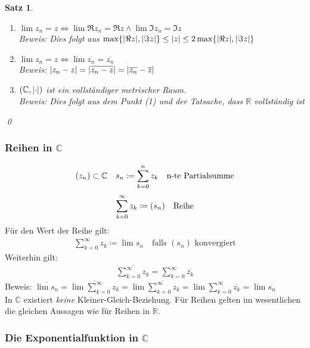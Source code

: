 \documentclass[ngerman,titlepage,twoside, parskip=half*]{scrreprt}
\newcommand*{\R}{\mathbb{R}}
\newcommand*{\C}{\mathbb{C}}
\theoremstyle{break}
\newtheorem{theorem}{Satz}[section]
\theoremstyle{nonumberbreak}
\DeclarePairedDelimiter{\abs}{\lvert}{\rvert}
\begin{document}
\begin{theorem}
\begin{enumerate}[(1)]
  \item $\lim z_n=z\Leftrightarrow \lim\Re z_n =\Re z \wedge \lim \Im z_n=\Im z$\\
    Beweis: Dies folgt aus $\max\{\abs{\Re z},\abs{\Im z}\}\leq \abs{z}\leq 2\max\{\abs{\Re z},\abs{\Im z}\}$
  \item $\lim z_n=z\Leftrightarrow \lim \overline{z_n}=\overline{z_n}$\\
    Beweis: $\abs{z_n-z}=\abs{\overline{z_n-z}}=\abs{\overline{z_n}-\overline{z}}$
  \item $(\C,\abs{\cdot })$ ist ein vollständiger metrischer Raum.\\
    Beweis: Dies folgt aus dem Punkt (1) und der Tatsache, dass $\R$ vollständig ist
\end{enumerate}
\qed
\end{theorem}

\subsubsection{Reihen in $\C$}
\begin{gather*}(z_n)\subset \C\quad s_n\coloneqq\sum_{k=0}^n z_k \quad \text{n-te Partialsumme\index{Partialsumme}}\end{gather*}
\begin{gather*}\sum_{k=0}^{\infty} z_k\coloneqq(s_n) \quad \text{Reihe\index{Reihe}}\end{gather*}
Für den Wert der Reihe gilt:
\begin{gather*}\sum_{k=0}^{\infty} z_k\coloneqq\lim s_n \quad \text{falls }(s_n) \text{ konvergiert}\end{gather*}
Weiterhin gilt:
\begin{gather*}\overline{\sum_{k=0}^{\infty} z_k}=\sum_{k=0}^\infty \overline{z_k}\end{gather*}
Beweis: $\overline{\lim s_n}=\overline{\lim\sum_{k=0}^\infty z_k}=\lim \overline{\sum_{k=0}^\infty
z_k}=\lim \sum_{k=0}^\infty \overline{z_k}=\lim \overline{s_n}$\\
In $\C$ existiert \emph{keine} Kleiner-Gleich-Beziehung. Für Reihen gelten im wesentlichen die
gleichen Aussagen wie für Reihen in $\R$.

\subsubsection{Die Exponentialfunktion in $\C$}
\end{document}
